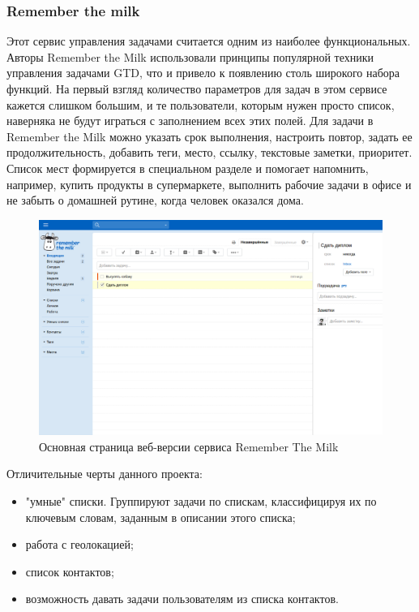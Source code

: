 \subsubsection{Remember the milk }
\label{sub:practice:analogs:remember_the_milk}

Этот сервис управления задачами считается одним из наиболее функциональных. Авторы Remember the Milk использовали принципы популярной техники управления задачами GTD, что и привело к появлению столь широкого набора функций. На первый взгляд количество параметров для задач в этом сервисе кажется слишком большим, и те пользователи, которым нужен просто список, наверняка не будут играться с заполнением всех этих полей. Для задачи в Remember the Milk можно указать срок выполнения, настроить повтор, задать ее продолжительность, добавить теги, место, ссылку, текстовые заметки, приоритет. Список мест формируется в специальном разделе и помогает напомнить, например, купить продукты в супермаркете, выполнить рабочие задачи в офисе и не забыть о домашней рутине, когда человек оказался дома. 

\begin{figure}[ht]
\centering
  \includegraphics[scale=0.35]{images/remember_the_milk.png}  
  \caption{  Основная страница веб-версии сервиса Remember The Milk }
  \label{fig:domain:remember_the_milk}
\end{figure}

Отличительные черты данного проекта:

\begin{itemize}
  \item "умные" списки. Группируют задачи по спискам, классифицируя их по ключевым словам, заданным в описании этого списка;
  \item работа с геолокацией;
  \item список контактов;
  \item возможность давать задачи пользователям из списка контактов.
\end{itemize}

